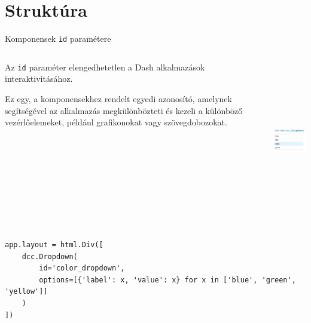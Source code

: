 \documentclass[english, aspectratio=169]{beamer}
\makeatletter
\let\origtableofcontents=\tableofcontents
\def\tableofcontents{\@ifnextchar[{\origtableofcontents}{\gobbletableofcontents}}
\def\gobbletableofcontents#1{\origtableofcontents}
\makeatother
\begin{document}
\section{Struktúra}

\begin{frame}
	\tableofcontents[currentsection]
\end{frame}

\begin{frame}[fragile]{Komponensek \texttt{id} paramétere}
	\begin{columns}
		\begin{column}{.5\textwidth}
			Az \texttt{id} paraméter elengedhetetlen a Dash alkalmazások interaktivitásához.\par\smallskip
			Ez egy, a komponensekhez rendelt egyedi azonosító, amelynek segítségével az alkalmazás megkülönbözteti és kezeli a különböző vezérlőelemeket, például grafikonokat vagy szövegdobozokat.
		\end{column}
		\begin{column}{.5\textwidth}
			\begin{center}
				\includegraphics[width=4cm, height=7cm, keepaspectratio]{images/dash_12.png}
			\end{center}
		\end{column}
	\end{columns}
	\medskip
	\begin{lstlisting}
app.layout = html.Div([
	dcc.Dropdown(
		id='color_dropdown',
		options=[{'label': x, 'value': x} for x in ['blue', 'green', 'yellow']]
	)
])				
	\end{lstlisting}
\end{frame}
\end{document}
